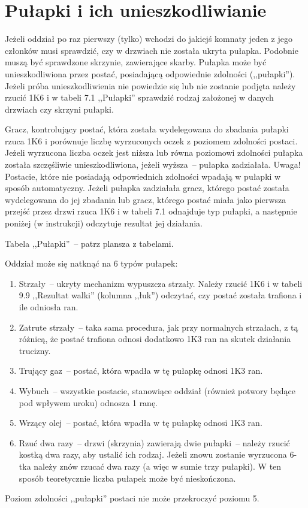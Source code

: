\section{Pułapki i ich unieszkodliwianie}

Jeżeli oddział po raz pierwszy (tylko) wchodzi do jakiejś komnaty jeden z jego członków musi sprawdzić, czy w drzwiach nie została ukryta pułapka.
Podobnie muszą być sprawdzone skrzynie, zawierające skarby.
Pułapka może być unieszkodliwiona przez postać, posiadającą odpowiednie zdolności (,,pułapki'').
Jeżeli próba unieszkodliwienia nie powiedzie się lub nie zostanie podjęta należy rzucić 1K6 i w tabeli 7.1 ,,Pułapki'' sprawdzić rodzaj założonej w danych drzwiach czy skrzyni pułapki.

Gracz, kontrolujący postać, która została wydelegowana do zbadania pułapki rzuca 1K6 i porównuje liczbę wyrzuconych oczek z poziomem zdolności postaci.
Jeżeli wyrzucona liczba oczek jest niższa lub równa poziomowi zdolności pułapka została szczęśliwie unieszkodliwiona, jeżeli wyższa~-- pułapka zadziałała.
Uwaga! Postacie, które nie posiadają odpowiednich zdolności wpadają w pułapki w sposób automatyczny.
Jeżeli pułapka zadziałała gracz, którego postać została wydelegowana do jej zbadania lub gracz, którego postać miała jako pierwsza przejść przez drzwi rzuca 1K6 i w tabeli 7.1 odnajduje typ pułapki, a następnie poniżej (w instrukcji) odczytuje rezultat jej działania.

Tabela ,,Pułapki''~-- patrz plansza z tabelami.

Oddział może się natknąć na 6 typów pułapek:

\begin{enumerate}
    \item
        Strzały~-- ukryty mechanizm wypuszcza strzały.
        Należy rzucić 1K6 i w tabeli 9.9 ,,Rezultat walki'' (kolumna ,,łuk'') odczytać, czy postać została trafiona i ile odniosła ran.
    \item
        Zatrute strzały~-- taka sama procedura, jak przy normalnych strzałach, z tą różnicą, że postać trafiona odnosi dodatkowo 1K3 ran na skutek działania trucizny.
    \item
        Trujący gaz~-- postać, która wpadła w tę pułapkę odnosi 1K3 ran.
    \item
        Wybuch~-- wszystkie postacie, stanowiące oddział (również potwory będące pod wpływem uroku) odnosza 1 ranę.
    \item
        Wrzący olej~-- postać, która wpadła w tę pułapkę odnosi 1K3 ran.
    \item
        Rzuć dwa razy~-- drzwi (skrzynia) zawierają dwie pułapki~-- należy rzucić kostką dwa razy, aby ustalić ich rodzaj.
        Jeżeli znowu zostanie wyrzucona 6-tka należy znów rzucać dwa razy (a więc w sumie trzy pułapki).
        W ten sposób teoretycznie liczba pułapek może być nieskończona.
\end{enumerate}

Poziom zdolności ,,pułapki'' postaci nie może przekroczyć poziomu 5.

